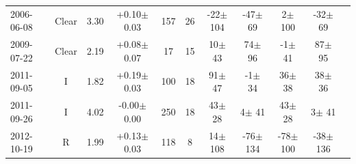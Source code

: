 \documentclass[12pt,a4paper]{report}
\begin{document}
\begin{landscape}
\begin{longtable}{|l|c|c|c|c|c|c|c|c|c|c|}
2006-06-08 & Clear & 3.30 & +0.10$\pm$0.03 & 157 &  26 &  -22$\pm$104 &  -47$\pm$ 69 &    2$\pm$100 &  -32$\pm$ 69 \\ 
2009-07-22 & Clear & 2.19 & +0.08$\pm$0.07 &  17 &  15 &   10$\pm$ 43 &   74$\pm$ 96 &   -1$\pm$ 41 &   87$\pm$ 95 \\ 
2011-09-05 & I     & 1.82 & +0.19$\pm$0.03 & 100 &  18 &   91$\pm$ 47 &   -1$\pm$ 34 &   36$\pm$ 38 &   38$\pm$ 36 \\ 
2011-09-26 & I     & 4.02 & -0.00$\pm$0.00 & 250 &  18 &   43$\pm$ 28 &    4$\pm$ 41 &   43$\pm$ 28 &    3$\pm$ 41 \\ 
2012-10-19 & R     & 1.99 & +0.13$\pm$0.03 & 118 &   8 &   14$\pm$108 &  -76$\pm$134 &  -78$\pm$100 &  -38$\pm$136 \\ 
\hline
\end{longtable}


\end{landscape}
\end{document}
